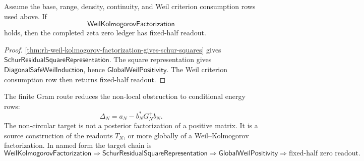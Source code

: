 \begin{corollary}
\label{cor:rh-weil-kolmogorov-factorization-fixed-half-readout}
Assume the base, range, density, continuity, and Weil criterion
consumption rows used above.  If
$$
\mathsf{WeilKolmogorovFactorization}
$$
holds, then the completed zeta zero ledger has fixed-half readout.
\end{corollary}

\begin{proof}
\autoref{thm:rh-weil-kolmogorov-factorization-gives-schur-squares}
gives $\mathsf{SchurResidualSquareRepresentation}$.  The square
representation gives $\mathsf{DiagonalSafeWeilInduction}$, hence
$\mathsf{GlobalWeilPositivity}$.  The Weil criterion consumption row
then returns fixed-half readout.
\end{proof}

\begin{principle}
\label{prin:rh-minimal-diagonal-safe-square-target}
The finite Gram route reduces the non-local obstruction to conditional
energy rows:
$$
\Delta_N
=
a_N-b_N^\ast G_N^+b_N.
$$
The non-circular target is not a posterior factorization of a positive
matrix.  It is a source construction of the readouts $T_N$, or more
globally of a Weil--Kolmogorov factorization.  In named form the target
chain is
$$
\mathsf{WeilKolmogorovFactorization}
\Longrightarrow
\mathsf{SchurResidualSquareRepresentation}
\Longrightarrow
\mathsf{GlobalWeilPositivity}
\Longrightarrow
\text{fixed-half zero readout}.
$$
\end{principle}
